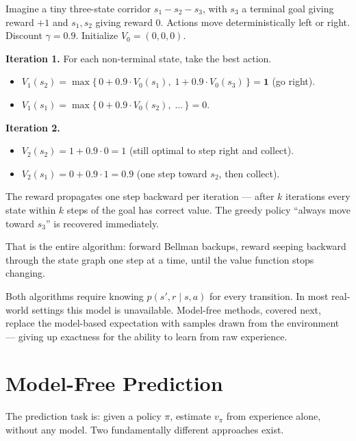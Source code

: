 \documentclass[11pt, oneside]{book}
\newcommand{\vpi}{v_{\pi}}               %
\begin{document}
\begin{exbox}[title={Value iteration unrolling, by hand}]
Imagine a tiny three-state corridor $s_1 - s_2 - s_3$, with $s_3$ a terminal goal
giving reward $+1$ and $s_1, s_2$ giving reward $0$. Actions move deterministically
left or right. Discount $\gamma = 0.9$. Initialize $V_0 = (0, 0, 0)$.

\textbf{Iteration 1.} For each non-terminal state, take the best action.
\begin{itemize}
  \item $V_1(s_2) = \max\{\, 0 + 0.9 \cdot V_0(s_1),\; 1 + 0.9 \cdot V_0(s_3)\, \} = \mathbf{1}$ (go right).
  \item $V_1(s_1) = \max\{\, 0 + 0.9 \cdot V_0(s_2),\; \dots\, \} = 0$.
\end{itemize}
\textbf{Iteration 2.}
\begin{itemize}
  \item $V_2(s_2) = 1 + 0.9 \cdot 0 = 1$ (still optimal to step right and collect).
  \item $V_2(s_1) = 0 + 0.9 \cdot 1 = 0.9$ (one step toward $s_2$, then collect).
\end{itemize}
The reward propagates one step backward per iteration --- after $k$ iterations every
state within $k$ steps of the goal has correct value. The greedy policy ``always
move toward $s_3$'' is recovered immediately.

That is the entire algorithm: forward Bellman backups, reward seeping backward through
the state graph one step at a time, until the value function stops changing.
\end{exbox}

\begin{intbox}[title={Limitation of DP}]
Both algorithms require knowing $p(s',r\mid s,a)$ for every transition.
In most real-world settings this model is unavailable.
Model-free methods, covered next, replace the model-based expectation with samples
drawn from the environment --- giving up exactness for the ability to learn from
raw experience.
\end{intbox}

\section{Model-Free Prediction}

The prediction task is: given a policy $\pi$, estimate $\vpi$ from experience
alone, without any model.
Two fundamentally different approaches exist.
\end{document}
